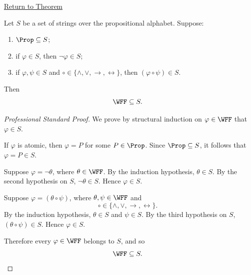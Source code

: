 \newpage
{}
\label{prf:minimality-of-well-formed-formulas}

\begin{remark*}[Return]
\hyperref[thm:minimality-of-well-formed-formulas]{Return to Theorem}
\end{remark*}


\begin{theorem*}
Let \(S\) be a set of strings over the propositional alphabet. Suppose:
\begin{enumerate}
  \item \(\Prop\subseteq S\);
  \item if \(\varphi\in S\), then \(\neg\varphi\in S\);
  \item if \(\varphi,\psi\in S\) and
        \(\circ\in\{\land,\lor,\to,\leftrightarrow\}\), then
        \((\varphi\circ\psi)\in S\).
\end{enumerate}
Then
\[
\WFF\subseteq S.
\]
\end{theorem*}

\begin{proof}[Professional Standard Proof]
\LRAProofBodyStart
We prove by structural induction on \(\varphi\in\WFF\) that
\(\varphi\in S\).

If \(\varphi\) is atomic, then \(\varphi=P\) for some
\(P\in\Prop\). Since \(\Prop\subseteq S\), it follows that
\(\varphi=P\in S\).

Suppose \(\varphi=\neg\theta\), where \(\theta\in\WFF\). By the induction
hypothesis, \(\theta\in S\). By the second hypothesis on \(S\),
\(\neg\theta\in S\). Hence \(\varphi\in S\).

Suppose \(\varphi=(\theta\circ\psi)\), where
\(\theta,\psi\in\WFF\) and
\[
\circ\in\{\land,\lor,\to,\leftrightarrow\}.
\]
By the induction hypothesis, \(\theta\in S\) and \(\psi\in S\). By the
third hypothesis on \(S\), \((\theta\circ\psi)\in S\). Hence
\(\varphi\in S\).

Therefore every \(\varphi\in\WFF\) belongs to \(S\), and so
\[
\WFF\subseteq S.
\]
\end{proof}


